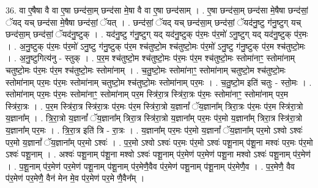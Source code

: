\documentclass[17pt]{extarticle}
\begin{document}
36. वा ए॒षैषा वै वा ए॒षा छन्द॑सा॒म् छन्द॑सा मे॒षा वै वा ए॒षा छन्द॑साम् । . ए॒षा छन्द॑सा॒म् छन्द॑सा मे॒षैषा छन्द॑सां॒ ॅयद् यच् छन्द॑सा मे॒षैषा छन्द॑सां॒ ॅयत् । . छन्द॑सां॒ ॅयद् यच् छन्द॑सा॒म् छन्द॑सां॒ ॅयद॑नु॒ष्टु ग॑नु॒ष्टुग् यच् छन्द॑सा॒म् छन्द॑सां॒ ॅयद॑नु॒ष्टुक् । . यद॑नु॒ष्टु ग॑नु॒ष्टुग् यद् यद॑नु॒ष्टुक् प॑र॒मः प॑र॒मो॑ ऽनु॒ष्टुग् यद् यद॑नु॒ष्टुक् प॑र॒मः । . अ॒नु॒ष्टुक् प॑र॒मः प॑र॒मो॑ ऽनु॒ष्टु ग॑नु॒ष्टुक् प॑र॒म श्च॑तुष्टो॒म श्च॑तुष्टो॒मः प॑र॒मो॑ ऽनु॒ष्टु ग॑नु॒ष्टुक् प॑र॒म श्च॑तुष्टो॒मः । . अ॒नु॒ष्टुगित्य॑नु - स्तुक् । . प॒र॒म श्च॑तुष्टो॒म श्च॑तुष्टो॒मः प॑र॒मः प॑र॒म श्च॑तुष्टो॒मः स्तोमा॑नाꣳ॒॒ स्तोमा॑नाम् चतुष्टो॒मः प॑र॒मः प॑र॒म श्च॑तुष्टो॒मः स्तोमा॑नाम् । . च॒तु॒ष्टो॒मः स्तोमा॑नाꣳ॒॒ स्तोमा॑नाम् चतुष्टो॒म श्च॑तुष्टो॒मः स्तोमा॑नाम् पर॒मः प॑र॒मः स्तोमा॑नाम् चतुष्टो॒म श्च॑तुष्टो॒मः स्तोमा॑नाम् पर॒मः । . च॒तु॒ष्टो॒म इति॑ चतुः - स्तो॒मः । . स्तोमा॑नाम् पर॒मः प॑र॒मः स्तोमा॑नाꣳ॒॒ स्तोमा॑नाम् पर॒म स्त्रि॑रा॒त्र स्त्रि॑रा॒त्रः प॑र॒मः स्तोमा॑नाꣳ॒॒ स्तोमा॑नाम् पर॒म स्त्रि॑रा॒त्रः । . प॒र॒म स्त्रि॑रा॒त्र स्त्रि॑रा॒त्रः प॑र॒मः प॑र॒म स्त्रि॑रा॒त्रो य॒ज्ञानां᳚ ॅय॒ज्ञाना᳚म् त्रिरा॒त्रः प॑र॒मः प॑र॒म स्त्रि॑रा॒त्रो य॒ज्ञाना᳚म् । . त्रि॒रा॒त्रो य॒ज्ञानां᳚ ॅय॒ज्ञाना᳚म् त्रिरा॒त्र स्त्रि॑रा॒त्रो य॒ज्ञाना᳚म् पर॒मः प॑र॒मो य॒ज्ञाना᳚म् त्रिरा॒त्र स्त्रि॑रा॒त्रो य॒ज्ञाना᳚म् पर॒मः । . त्रि॒रा॒त्र इति॑ त्रि - रा॒त्रः । . य॒ज्ञाना᳚म् पर॒मः प॑र॒मो य॒ज्ञानां᳚ ॅय॒ज्ञाना᳚म् पर॒मो ऽश्वो ऽश्वः॑ पर॒मो य॒ज्ञानां᳚ ॅय॒ज्ञाना᳚म् पर॒मो ऽश्वः॑ । . प॒र॒मो ऽश्वो ऽश्वः॑ पर॒मः प॑र॒मो ऽश्वः॑ पशू॒नाम् प॑शू॒ना मश्वः॑ पर॒मः प॑र॒मो ऽश्वः॑ पशू॒नाम् । . अश्वः॑ पशू॒नाम् प॑शू॒ना मश्वो ऽश्वः॑ पशू॒नाम् प॑र॒मेण॑ पर॒मेण॑ पशू॒ना मश्वो ऽश्वः॑ पशू॒नाम् प॑र॒मेण॑ । . प॒शू॒नाम् प॑र॒मेण॑ पर॒मेण॑ पशू॒नाम् प॑शू॒नाम् प॑र॒मेणै॒वैव प॑र॒मेण॑ पशू॒नाम् प॑शू॒नाम् प॑र॒मेणै॒व । . प॒र॒मेणै॒ वैव प॑र॒मेण॑ पर॒मेणै॒ वैन॑ मेन मे॒व प॑र॒मेण॑ पर॒मे णै॒वैन᳚म् । \newline
\end{document}
